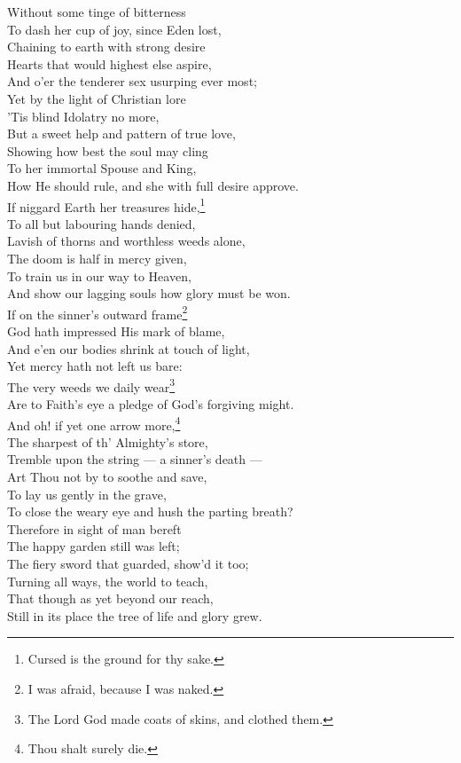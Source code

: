  Without some tinge of bitterness \\
 To dash her cup of joy, since Eden lost, \\
 Chaining to earth with strong desire \\
 Hearts that would highest else aspire, \\
 And o’er the tenderer sex usurping ever most; \\
  Yet by the light of Christian lore \\
 ’Tis blind Idolatry no more, \\
 But a sweet help and pattern of true love, \\
 Showing how best the soul may cling \\
 To her immortal Spouse and King, \\
 How He should rule, and she with full desire approve. \\
  If niggard Earth her treasures hide,\footnote{Cursed is the ground for thy sake.} \\
 To all but labouring hands denied, \\
 Lavish of thorns and worthless weeds alone, \\
 The doom is half in mercy given, \\
 To train us in our way to Heaven, \\
 And show our lagging souls how glory must be won. \\
  If on the sinner’s outward frame\footnote{I was afraid, because I was naked.} \\
 God hath impressed His mark of blame, \\
 And e’en our bodies shrink at touch of light, \\
 Yet mercy hath not left us bare: \\
 The very weeds we daily wear\footnote{The Lord God made coats of skins, and clothed them.} \\
 Are to Faith’s eye a pledge of God’s forgiving might. \\
  And oh! if yet one arrow more,\footnote{Thou shalt surely die.} \\
 The sharpest of th’ Almighty’s store, \\
 Tremble upon the string — a sinner’s death — \\
 Art Thou not by to soothe and save, \\
 To lay us gently in the grave, \\
 To close the weary eye and hush the parting breath? \\
  Therefore in sight of man bereft \\
 The happy garden still was left; \\
 The fiery sword that guarded, show’d it too; \\
 Turning all ways, the world to teach, \\
 That though as yet beyond our reach, \\
 Still in its place the tree of life and glory grew.\\

